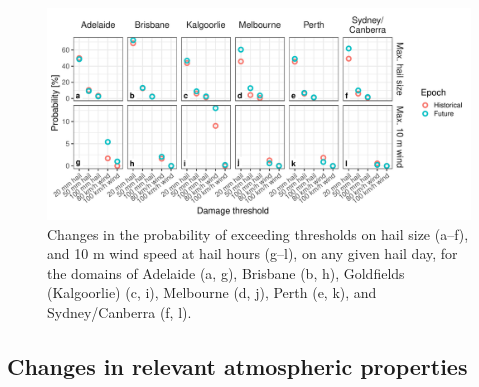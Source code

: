 \documentclass[]{agujournal2019}\usepackage[]{graphicx}\usepackage[]{xcolor}
\begin{document}
\begin{figure}[!ht]
      \includegraphics[width=\textwidth]{figures/threshold_probs}
      \caption{Changes in the probability of exceeding thresholds on hail size (a--f), and 10 m wind speed at hail hours (g--l), on any given hail day, for the domains of Adelaide (a, g), Brisbane (b, h), Goldfields (Kalgoorlie) (c, i), Melbourne (d, j), Perth (e, k), and Sydney/Canberra (f, l).}
      \label{fig:thresholds}
\end{figure}

\subsection{Changes in relevant atmospheric properties}
\end{document}
